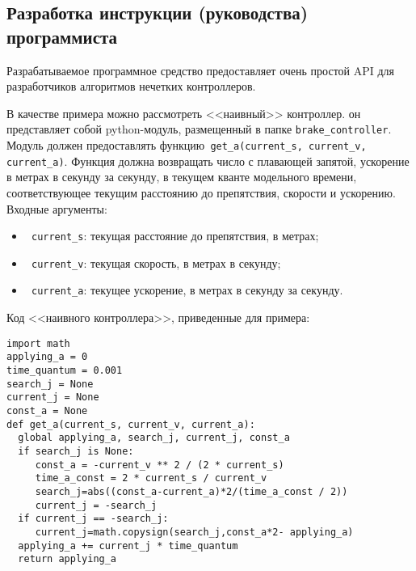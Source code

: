 \subsection{ Разработка инструкции (руководства) программиста }

Разрабатываемое программное средство предоставляет очень простой API для разработчиков алгоритмов нечетких контроллеров.

В качестве примера можно рассмотреть <<наивный>> контроллер. он представляет собой python-модуль, размещенный в папке \lstinline!brake_controller!. Модуль должен предоставлять функцию\lstinline! get_a(current_s, current_v, current_a)!. Функция должна возвращать число с плавающей запятой, ускорение в метрах в секунду за секунду, в текущем кванте модельного времени, соответствующее текущим расстоянию до препятствия, скорости и ускорению. Входные аргументы:

\begin{itemize}
	\item \lstinline! current_s!: текущая расстояние до препятствия, в метрах;
	\item \lstinline! current_v!: текущая скорость, в метрах в секунду;
	\item \lstinline! current_a!: текущее ускорение, в метрах в секунду за секунду.

\end{itemize}

Код <<наивного контроллера>>, приведенные для примера:

\begin{lstlisting}[style=pythonstyle,caption={  }, label=lst:func:1]
import math
applying_a = 0
time_quantum = 0.001
search_j = None
current_j = None
const_a = None
def get_a(current_s, current_v, current_a):
  global applying_a, search_j, current_j, const_a
  if search_j is None:
     const_a = -current_v ** 2 / (2 * current_s)
     time_a_const = 2 * current_s / current_v
     search_j=abs((const_a-current_a)*2/(time_a_const / 2))
     current_j = -search_j
  if current_j == -search_j:
     current_j=math.copysign(search_j,const_a*2- applying_a)
  applying_a += current_j * time_quantum
  return applying_a
\end{lstlisting}
